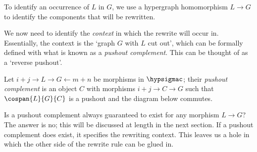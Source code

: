 To identify an occurrence of \(L\) in \(G\), we use a
hypergraph homomorphism \(L \to G\) to identify the components that will be
rewritten.

\begin{center}
\end{center}

We now need to identify the \emph{context} in which the rewrite will occur in.
Essentially, the context is the `graph \(G\) with \(L\) cut out', which can be
formally defined with what is known as a \emph{pushout complement}.
This can be thought of as a `reverse pushout'.

\begin{definition}\label{def:pushout-complement}
    Let \(i+j \to L \to G \leftarrow m+n\) be morphisms in
    \(\hypsigmac\); their \emph{pushout complement} is an object \(C\)
    with morphisms \(i+j \to C \to G\) such that \(\cospan{L}{G}{C}\) is a
    pushout and the diagram below commutes.
    \begin{center}
    \end{center}
\end{definition}

Is a pushout complement always guaranteed to exist for any morphism \(L \to G\)?
The answer is no; this will be discussed at length in the next section.
If a pushout complement does exist, it specifies the rewriting context.
This leaves us a hole in which the other side of the rewrite rule can be glued
in.

\begin{center}
\end{center}

